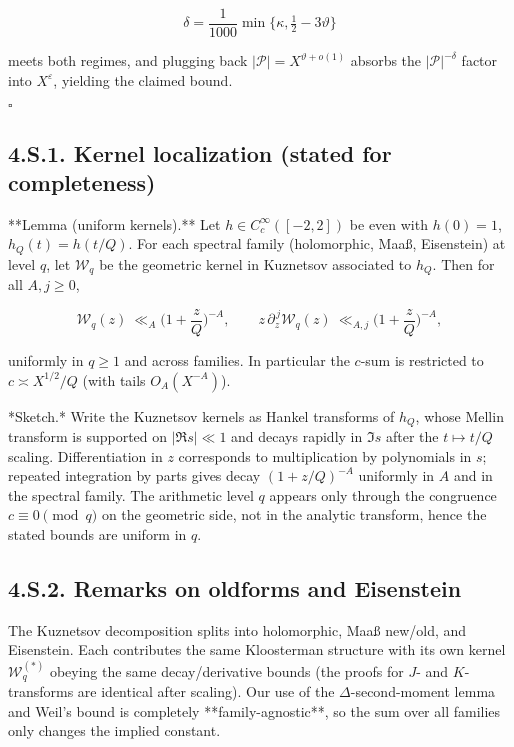 \documentclass[11pt]{article}
\theoremstyle{definition}
\theoremstyle{remark}
\begin{document}
$$
\delta=\frac1{1000}\min\{\kappa,\tfrac12-3\vartheta\}
$$

meets both regimes, and plugging back $|\mathcal P|=X^{\vartheta+o(1)}$ absorbs the $|\mathcal P|^{-\delta}$ factor into $X^\varepsilon$, yielding the claimed bound.

$\square$

\subsection*{4.S.1. Kernel localization (stated for completeness)}

**Lemma (uniform kernels).**
Let $h\in C_c^\infty([-2,2])$ be even with $h(0)=1$, $h_Q(t)=h(t/Q)$. For each spectral family (holomorphic, Maaß, Eisenstein) at level $q$, let $\mathcal W_q$ be the geometric kernel in Kuznetsov associated to $h_Q$. Then for all $A,j\ge0$,

$$
\mathcal W_q(z)\ \ll_A\Big(1+\frac zQ\Big)^{-A},\qquad
z\,\partial_z^{\,j}\mathcal W_q(z)\ \ll_{A,j}\Big(1+\frac zQ\Big)^{-A},
$$

uniformly in $q\ge 1$ and across families. In particular the $c$-sum is restricted to $c\asymp X^{1/2}/Q$ (with tails $O_A(X^{-A})$).

*Sketch.* Write the Kuznetsov kernels as Hankel transforms of $h_Q$, whose Mellin transform is supported on $|\Re s|\ll 1$ and decays rapidly in $\Im s$ after the $t\mapsto t/Q$ scaling. Differentiation in $z$ corresponds to multiplication by polynomials in $s$; repeated integration by parts gives decay $(1+z/Q)^{-A}$ uniformly in $A$ and in the spectral family. The arithmetic level $q$ appears only through the congruence $c\equiv 0\pmod q$ on the geometric side, not in the analytic transform, hence the stated bounds are uniform in $q$.

\subsection*{4.S.2. Remarks on oldforms and Eisenstein}

The Kuznetsov decomposition splits into holomorphic, Maaß new/old, and Eisenstein. Each contributes the same Kloosterman structure with its own kernel $\mathcal W_q^{(*)}$ obeying the same decay/derivative bounds (the proofs for $J$- and $K$-transforms are identical after scaling). Our use of the $\Delta$-second-moment lemma and Weil’s bound is completely **family-agnostic**, so the sum over all families only changes the implied constant.
\end{document}
